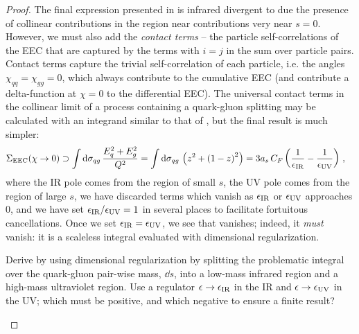 \begin{proof}
The final expression presented in  is infrared divergent to due the presence of collinear contributions in the region near contributions very near \(s = 0\).
%
However, we must also add the \emph{contact terms} -- the particle self-correlations of the EEC that are captured by the terms with \(i=j\) in the sum over particle pairs.
%
Contact terms capture the trivial self-correlation of each particle, i.e. the angles \(\chi_{qq} = \chi_{gg} = 0\), which always contribute to the cumulative EEC (and contribute a delta-function at \(\chi = 0\) to the differential EEC).
%
The universal contact terms in the collinear limit of a process containing a quark-gluon splitting may be calculated with an integrand similar to that of , but the final result is much simpler:
\begin{align}
    \label{eq:eec_contact}
    \Sigma_\text{EEC}(\chi \to 0)
    &\supset
    \int \dd\sigma_{qg} \,
        \frac{E_q^2 + E_g^2}{Q^2}
    =
    \int \dd\sigma_{qg} \,
    \le(z^2 + \le(1-z\ri)^2\ri)
    =
    3 \ascf
    \le(\frac{1}{\epsir} - \frac{1}{\epsuv}\ri)
    \,,
\end{align}
where the IR pole comes from the region of small \(s\), the UV pole comes from the region of large \(s\), we have discarded terms which vanish as \(\epsilon_\text{IR}\) or \(\epsilon_\text{UV}\) approaches 0, and we have set \(\epsilon_\text{IR}/\epsilon_\text{UV} = 1\) in several places to facilitate fortuitous cancellations.
%
Once we set \(\epsilon_\text{IR} = \epsilon_\text{UV}\), we see that  vanishes;
%
indeed, it \textit{must} vanish:
%
it is a scaleless integral evaluated with dimensional regularization.


\begin{exercise}
    Derive  by using dimensional regularization by splitting the problematic integral over the quark-gluon pair-wise mass, \(\dd s\), into a low-mass infrared region and a high-mass ultraviolet region.
    Use a regulator \(\epsilon \to \epsilon_\text{IR}\) in the IR and \(\epsilon \to \epsilon_\text{UV}\) in the UV;
    which must be positive, and which negative to ensure a finite result?
\end{exercise}




\end{proof}
